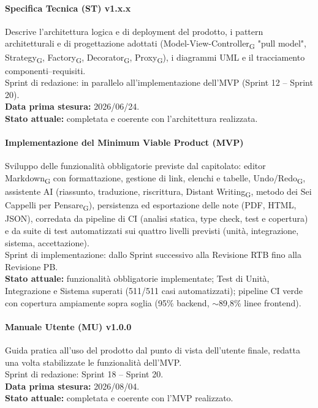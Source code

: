 \paragraph{Specifica Tecnica (ST) v1.x.x}
Descrive l'architettura logica e di deployment del prodotto, i pattern
architetturali e di progettazione adottati (Model-View-Controller\textsubscript{G}
"pull model", Strategy\textsubscript{G}, Factory\textsubscript{G},
Decorator\textsubscript{G}, Proxy\textsubscript{G}), i diagrammi UML e il
tracciamento componenti--requisiti.\\
Sprint di redazione: in parallelo all'implementazione dell'MVP (Sprint 12 -- Sprint 20).\\
\textbf{Data prima stesura:} 2026/06/24.\\
\textbf{Stato attuale:} completata e coerente con l'architettura
realizzata.

\paragraph{Implementazione del Minimum Viable Product (MVP)}
Sviluppo delle funzionalità obbligatorie previste dal capitolato: editor
Markdown\textsubscript{G} con formattazione, gestione di link, elenchi e
tabelle, Undo/Redo\textsubscript{G}, assistente AI (riassunto, traduzione,
riscrittura, Distant Writing\textsubscript{G}, metodo dei Sei Cappelli per
Pensare\textsubscript{G}), persistenza ed esportazione delle note (PDF, HTML,
JSON), corredata da pipeline di CI (analisi statica, type check, test e
copertura) e da suite di test automatizzati sui quattro livelli previsti
(unità, integrazione, sistema, accettazione).\\
Sprint di implementazione: dallo Sprint successivo alla Revisione RTB fino
alla Revisione PB.\\
\textbf{Stato attuale:} funzionalità obbligatorie implementate; Test di Unità,
Integrazione e Sistema superati (511/511 casi automatizzati); pipeline CI
verde con copertura ampiamente sopra soglia (95\% backend, $\sim$89,8\% linee
frontend).

\paragraph{Manuale Utente (MU) v1.0.0}
Guida pratica all'uso del prodotto dal punto di vista dell'utente finale,
redatta una volta stabilizzate le funzionalità dell'MVP.\\
Sprint di redazione: Sprint 18 -- Sprint 20.\\
\textbf{Data prima stesura:} 2026/08/04.\\
\textbf{Stato attuale:} completata e coerente con l'MVP
realizzato.

